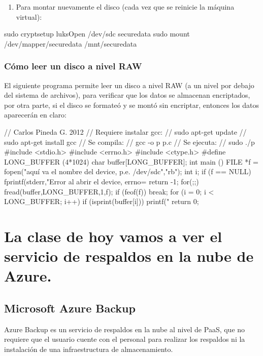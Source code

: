 \begin{enumerate}
\item Para montar nuevamente el disco (cada vez que se reinicie la máquina virtual):
\end{enumerate}

\begin{SourceCode}
sudo cryptsetup luksOpen /dev/sdc securedata
sudo mount /dev/mapper/securedata /mnt/securedata
\end{SourceCode}

\subsection{Cómo leer un disco a nivel RAW}

El siguiente programa permite leer un disco a nivel RAW (a un nivel por debajo del sistema de archivos), para verificar que los datos se almacenan encriptados, por otra parte, si el disco se formateó y se montó sin encriptar, entonces los datos aparecerán en claro:

\begin{SourceCode}
// Carlos Pineda G. 2012
// Requiere instalar gcc:
// sudo apt-get update
// sudo apt-get install gcc
// Se compila:
// gcc -o p p.c
// Se ejecuta:
// sudo ./p
#include <stdio.h>
#include <errno.h>
#include <ctype.h>
#define LONG_BUFFER (4*1024)
char buffer[LONG_BUFFER];
int main ()
{
  FILE *f = fopen("aquí va el nombre del device, p.e. /dev/sdc","rb");
  int i;
  if (f == NULL)
  {
fprintf(stderr,"Error al abrir el device, errno=%
return -1;
  }
  for(;;)
  {
fread(buffer,LONG_BUFFER,1,f);
if (feof(f))
break;
for (i = 0; i < LONG_BUFFER; i++)
if (isprint(buffer[i]))
printf("%
  }
  return 0;
}
\end{SourceCode}

\clearpage


\chapter{La clase de hoy vamos a ver el servicio de respaldos en la nube de Azure.}

\section{Microsoft Azure Backup}

Azure Backup es un servicio de respaldos en la nube al nivel de PaaS, que no requiere que el usuario cuente con el personal para realizar los respaldos ni la instalación de una infraestructura de almacenamiento.

